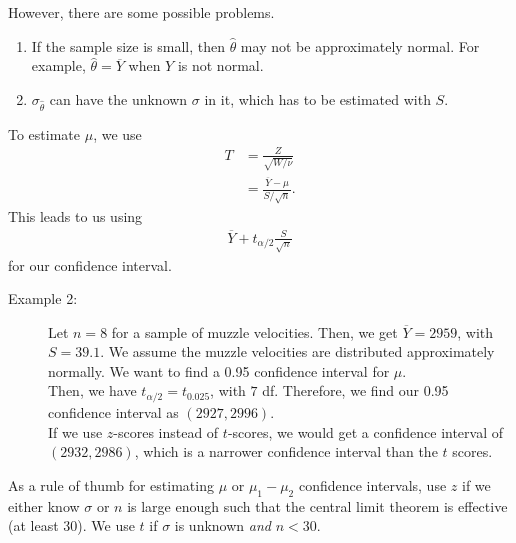 \documentclass[10pt]{extarticle}
\begin{document}
  However, there are some possible problems.
  \begin{enumerate}[(1)]
    \item If the sample size is small, then $\hat{\theta}$ may not be approximately normal. For example, $\hat{\theta} = \overline{Y}$ when $Y$ is not normal.
    \item $\sigma_{\hat{\theta}}$ can have the unknown $\sigma$ in it, which has to be estimated with $S$.
  \end{enumerate}
  To estimate $\mu$, we use
  \begin{align*}
    T &= \frac{Z}{\sqrt{W/\nu}}\\
      &= \frac{\overline{Y}-\mu}{S/\sqrt{n}}.
  \end{align*}
  This leads to us using
  \begin{align*}
    \overline{Y} + t_{\alpha/2} \frac{S}{\sqrt{n}}
  \end{align*}
  for our confidence interval.
  \begin{description}
    \item[Example 2:] Let $n=8$ for a sample of muzzle velocities. Then, we get $\overline{Y} = 2959$, with $S = 39.1$. We assume the muzzle velocities are distributed approximately normally. We want to find a 0.95 confidence interval for $\mu$.\\

      Then, we have $t_{\alpha/2} = t_{0.025}$, with $7$ df. Therefore, we find our 0.95 confidence interval as $(2927,2996)$.\\

      If we use $z$-scores instead of $t$-scores, we would get a confidence interval of $(2932,2986)$, which is a narrower confidence interval than the $t$ scores.
  \end{description}
  As a rule of thumb for estimating $\mu$ or $\mu_1-\mu_2$ confidence intervals, use $z$ if we either know $\sigma$ or $n$ is large enough such that the central limit theorem is effective (at least 30). We use $t$ if $\sigma$ is unknown \textit{and} $n<30$.
\end{document}
